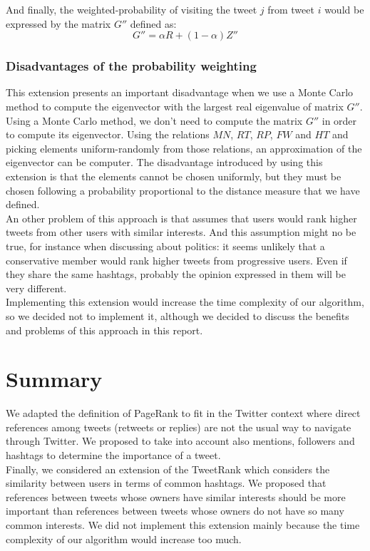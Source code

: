 \documentclass[12pt,a4paper]{article}
\begin{document}
And finally, the weighted-probability of visiting the tweet $j$ from tweet $i$ would be expressed by the matrix $G''$ defined as:
\begin{equation}
G'' = \alpha R + (1 - \alpha) Z''
\end{equation}

\subsubsection*{Disadvantages of the probability weighting}
This extension presents an important disadvantage when we use a Monte Carlo method to compute the eigenvector with the largest real eigenvalue of matrix $G''$. Using a Monte Carlo method, we don't need to compute the matrix $G''$ in order to compute its eigenvector. Using the relations $MN$, $RT$, $RP$, $FW$ and $HT$ and picking elements uniform-randomly from those relations, an approximation of the eigenvector can be computer. The disadvantage introduced by using this extension is that the elements cannot be chosen uniformly, but they must be chosen following a probability proportional to the distance measure that we have defined. \\

An other problem of this approach is that assumes that users would rank higher tweets from other users with similar interests. And this assumption might no be true, for instance when discussing about politics: it seems unlikely that a conservative member would rank higher tweets from progressive users. Even if they share the same hashtags, probably the opinion expressed in them will be very different. \\

Implementing this extension would increase the time complexity of our algorithm, so we decided not to implement it, although we decided to discuss the benefits and problems of this approach in this report.

\section{Summary}
We adapted the definition of PageRank to fit in the Twitter context where direct references among tweets (retweets or replies) are not the usual way to navigate through Twitter. We proposed to take into account also mentions, followers and hashtags to determine the importance of a tweet. \\

Finally, we considered an extension of the TweetRank which considers the similarity between users in terms of common hashtags. We proposed that references between tweets whose owners have similar interests should be more important than references between tweets whose owners do not have so many common interests. We did not implement this extension mainly because the time complexity of our algorithm would increase too much. \\
\end{document}
